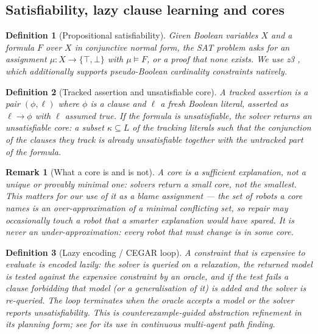 \documentclass[conference]{IEEEtran}
\newtheorem{definition}{Definition}
\newtheorem{remark}{Remark}
\begin{document}
\subsection{Satisfiability, lazy clause learning and cores}
\label{sec:prelim-sat}

\begin{definition}[Propositional satisfiability]
Given Boolean variables $X$ and a formula $F$ over $X$ in conjunctive normal form, the SAT
problem asks for an assignment $\mu : X \to \{\top,\bot\}$ with $\mu \models F$, or a proof
that none exists. We use z3 \cite{z3}, which additionally supports pseudo-Boolean
cardinality constraints natively.
\end{definition}

\begin{definition}[Tracked assertion and unsatisfiable core]
\label{def:core}
A \emph{tracked} assertion is a pair $(\phi, \ell)$ where $\phi$ is a clause and $\ell$ a
fresh Boolean literal, asserted as $\ell \rightarrow \phi$ with $\ell$ assumed true. If the
formula is unsatisfiable, the solver returns an \emph{unsatisfiable core}: a subset
$\kappa \subseteq L$ of the tracking literals such that the conjunction of the clauses they
track is already unsatisfiable together with the untracked part of the formula.
\end{definition}

\begin{remark}[What a core is and is not]
A core is a \emph{sufficient} explanation, not a unique or provably minimal one: solvers
return a small core, not the smallest. This matters for our use of it as a blame
assignment --- the set of robots a core names is an over-approximation of a minimal
conflicting set, so repair may occasionally touch a robot that a smarter explanation would
have spared. It is never an under-approximation: every robot that \emph{must} change is in
some core.
\end{remark}

\begin{definition}[Lazy encoding / CEGAR loop]
\label{def:cegar}
A constraint that is expensive to evaluate is encoded \emph{lazily}: the solver is queried
on a relaxation, the returned model is tested against the expensive constraint by an
\emph{oracle}, and if the test fails a clause forbidding that model (or a generalisation of
it) is added and the solver is re-queried. The loop terminates when the oracle accepts a
model or the solver reports unsatisfiability. This is
counterexample-guided abstraction refinement in its planning form; see \cite{surynek2020}
for its use in continuous multi-agent path finding.
\end{definition}
\end{document}
